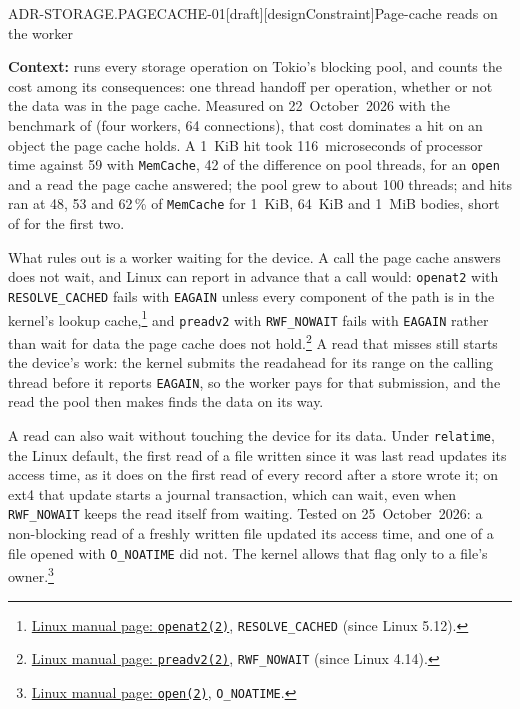 \begin{requirement}{ADR-STORAGE.PAGECACHE-01}[draft][designConstraint]{Page-cache reads on the worker}


  \textbf{Context:}  runs every storage
  operation on Tokio's blocking pool, and counts the cost among its
  consequences: one thread handoff per operation, whether or not the data
  was in the page cache. Measured on 22~October~2026 with the benchmark of
   (four workers, 64 connections), that cost
  dominates a hit on an object the page cache holds. A 1~KiB hit took
  116~microseconds of processor time against 59 with \texttt{MemCache}, 42 of
  the difference on pool threads, for an \texttt{open} and a read the page
  cache answered; the pool grew to about 100 threads; and hits ran at 48, 53
  and 62\,\% of \texttt{MemCache} for 1~KiB, 64~KiB and 1~MiB bodies, short
  of  for the first two.

  What  rules out is a worker waiting for the
  device. A call the page cache answers does not wait, and Linux can report
  in advance that a call would: \texttt{openat2} with
  \texttt{RESOLVE\_CACHED} fails with \texttt{EAGAIN} unless every component
  of the path is in the kernel's lookup
  cache,\footnote{\href{https://man7.org/linux/man-pages/man2/openat2.2.html}{Linux
  manual page: \texttt{openat2(2)}}, \texttt{RESOLVE\_CACHED} (since Linux
  5.12).} and \texttt{preadv2} with \texttt{RWF\_NOWAIT} fails with
  \texttt{EAGAIN} rather than wait for data the page cache does not
  hold.\footnote{\href{https://man7.org/linux/man-pages/man2/preadv2.2.html}{Linux
  manual page: \texttt{preadv2(2)}}, \texttt{RWF\_NOWAIT} (since Linux 4.14).}
  A read that misses still starts the device's work: the kernel submits the
  readahead for its range on the calling thread before it reports
  \texttt{EAGAIN}, so the worker pays for that submission, and the read the
  pool then makes finds the data on its way.

  A read can also wait without touching the device for its data. Under
  \texttt{relatime}, the Linux default, the first read of a file written
  since it was last read updates its access time, as it does on the first
  read of every record after a store wrote it; on ext4 that update starts a
  journal transaction, which can wait, even when \texttt{RWF\_NOWAIT} keeps
  the read itself from waiting. Tested on 25~October~2026: a non-blocking
  read of a freshly written file updated its access time, and one of a file
  opened with \texttt{O\_NOATIME} did not. The kernel allows that flag only
  to a file's owner.\footnote{\href{https://man7.org/linux/man-pages/man2/open.2.html}{Linux
  manual page: \texttt{open(2)}}, \texttt{O\_NOATIME}.}


\end{requirement}
